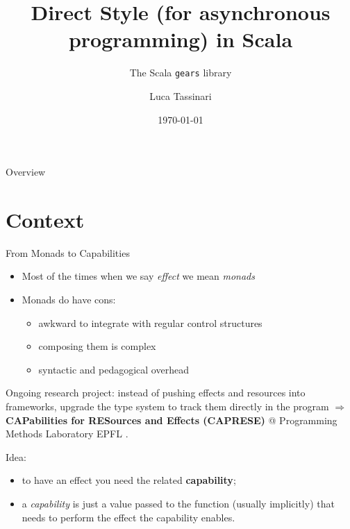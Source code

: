 \documentclass[aspectratio=169,xcolor=dvipsnames]{beamer}
\title{Direct Style (for asynchronous programming) in Scala}
\subtitle{The Scala \texttt{gears} library}
\author{Luca Tassinari}
\date{\today} %
\begin{document}
\begin{frame}
    \titlepage
\end{frame}

\begin{frame}{Overview}
    \tableofcontents
\end{frame}

\section{Context}

\begin{frame}{From Monads to Capabilities}
    \begin{itemize}
        \item Most of the times when we say \emph{effect} we mean \emph{monads}
        \item Monads do have cons:
        \begin{itemize}
            \item awkward to integrate with regular control structures
            \item composing them is complex
            \item syntactic and pedagogical overhead
        \end{itemize}
    \end{itemize}

    \begin{block}{}
        Ongoing research project: instead of pushing effects and resources into frameworks, upgrade the type system to track them directly in the program $\Rightarrow$ \textbf{CAPabilities for RESources and Effects (CAPRESE)} @ Programming Methods Laboratory EPFL \cite{capabilities}.
    \end{block}

    Idea:
    \begin{itemize}
        \item to have
        an effect you need the related \textbf{capability};
        \item a \textit{capability} is just a value passed to the function (usually implicitly) that needs to perform the effect the capability enables.
    \end{itemize}
\end{frame}
\end{document}
